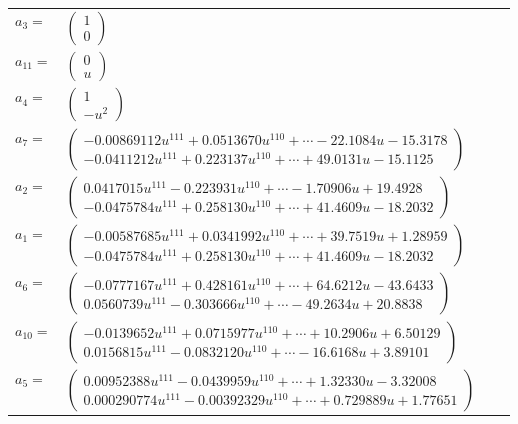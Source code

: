 \documentclass[1p]{elsarticle_modified}
\theoremstyle{definition}
\begin{document}
\begin{tabular}{m{7pt} m{180pt} m{7pt} m{180pt} }
\flushright $a_{3}=$&$\begin{pmatrix}1\\0\end{pmatrix}$ \\
\flushright $a_{11}=$&$\begin{pmatrix}0\\u\end{pmatrix}$ \\
\flushright $a_{4}=$&$\begin{pmatrix}1\\- u^2\end{pmatrix}$ \\
\flushright $a_{7}=$&$\begin{pmatrix}-0.00869112 u^{111}+0.0513670 u^{110}+\cdots-22.1084 u-15.3178\\-0.0411212 u^{111}+0.223137 u^{110}+\cdots+49.0131 u-15.1125\end{pmatrix}$ \\
\flushright $a_{2}=$&$\begin{pmatrix}0.0417015 u^{111}-0.223931 u^{110}+\cdots-1.70906 u+19.4928\\-0.0475784 u^{111}+0.258130 u^{110}+\cdots+41.4609 u-18.2032\end{pmatrix}$ \\
\flushright $a_{1}=$&$\begin{pmatrix}-0.00587685 u^{111}+0.0341992 u^{110}+\cdots+39.7519 u+1.28959\\-0.0475784 u^{111}+0.258130 u^{110}+\cdots+41.4609 u-18.2032\end{pmatrix}$ \\
\flushright $a_{6}=$&$\begin{pmatrix}-0.0777167 u^{111}+0.428161 u^{110}+\cdots+64.6212 u-43.6433\\0.0560739 u^{111}-0.303666 u^{110}+\cdots-49.2634 u+20.8838\end{pmatrix}$ \\
\flushright $a_{10}=$&$\begin{pmatrix}-0.0139652 u^{111}+0.0715977 u^{110}+\cdots+10.2906 u+6.50129\\0.0156815 u^{111}-0.0832120 u^{110}+\cdots-16.6168 u+3.89101\end{pmatrix}$ \\
\flushright $a_{5}=$&$\begin{pmatrix}0.00952388 u^{111}-0.0439959 u^{110}+\cdots+1.32330 u-3.32008\\0.000290774 u^{111}-0.00392329 u^{110}+\cdots+0.729889 u+1.77651\end{pmatrix}$ \\

\end{tabular}
\end{document}
